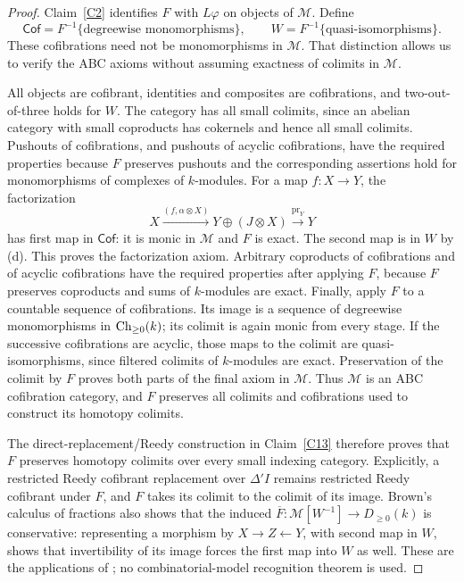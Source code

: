 \begin{proof}
Claim~\ref{C2} identifies $F$ with $L\varphi$ on objects of $\mathcal M$. Define
\[
 \mathsf{Cof}=F^{-1}\{\text{degreewise monomorphisms}\},
 \qquad W=F^{-1}\{\text{quasi-isomorphisms}\}.
\]
These cofibrations need not be monomorphisms in $\mathcal M$. That distinction allows us to verify the ABC axioms without assuming exactness of colimits in $\mathcal M$.

All objects are cofibrant, identities and composites are cofibrations, and two-out-of-three holds for $W$. The category has all small colimits, since an abelian category with small coproducts has cokernels and hence all small colimits. Pushouts of cofibrations, and pushouts of acyclic cofibrations, have the required properties because $F$ preserves pushouts and the corresponding assertions hold for monomorphisms of complexes of $k$-modules. For a map $f:X\to Y$, the factorization
\[
 X\xrightarrow{(f,\alpha\otimes X)}Y\oplus(J\otimes X)
 \xrightarrow{\mathrm{pr}_Y}Y
\]
has first map in $\mathsf{Cof}$: it is monic in $\mathcal M$ and $F$ is exact. The second map is in $W$ by (d). This proves the factorization axiom. Arbitrary coproducts of cofibrations and of acyclic cofibrations have the required properties after applying $F$, because $F$ preserves coproducts and sums of $k$-modules are exact. Finally, apply $F$ to a countable sequence of cofibrations. Its image is a sequence of degreewise monomorphisms in $\operatorname{Ch}_{\geq0}(k)$; its colimit is again monic from every stage. If the successive cofibrations are acyclic, those maps to the colimit are quasi-isomorphisms, since filtered colimits of $k$-modules are exact. Preservation of the colimit by $F$ proves both parts of the final axiom in $\mathcal M$. Thus $\mathcal M$ is an ABC cofibration category, and $F$ preserves all colimits and cofibrations used to construct its homotopy colimits.

The direct-replacement/Reedy construction in Claim~\ref{C13} therefore proves that $F$ preserves homotopy colimits over every small indexing category. Explicitly, a restricted Reedy cofibrant replacement over $\Delta'I$ remains restricted Reedy cofibrant under $F$, and $F$ takes its colimit to the colimit of its image. Brown's calculus of fractions also shows that the induced $\overline F:\mathcal M[W^{-1}]\to D_{\geq0}(k)$ is conservative: representing a morphism by $X\to Z\leftarrow Y$, with second map in $W$, shows that invertibility of its image forces the first map into $W$ as well. These are the applications of \citet[Theorems 6.4.4 and 9.6.3]{RadulescuBanu2009}; no combinatorial-model recognition theorem is used.


\end{proof}
